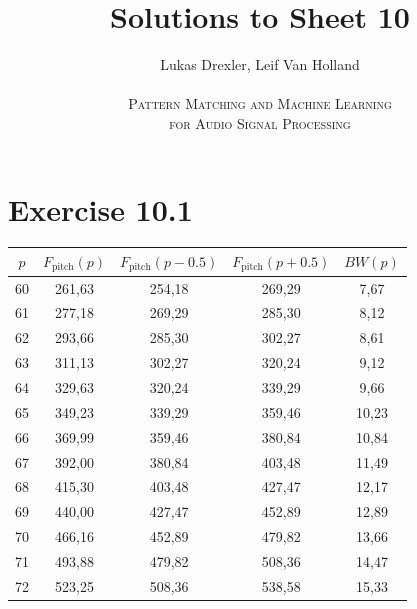\documentclass[12pt]{article}
\begin{document}
\title{Solutions to Sheet 10}
\author{Lukas Drexler, Leif Van Holland \\ \\
\textsc{Pattern Matching and Machine Learning} \\
\textsc{for Audio Signal Processing}}
\maketitle

\section*{Exercise 10.1}
\begin{center}
\begin{tabular}{c|c|c|c|c}
    $p$ & $F_{\text{pitch}}(p)$ & $F_{\text{pitch}}(p-0.5)$ & $F_{\text{pitch}}(p+0.5)$ & $BW(p)$ \\
    \hline
    60 & 261,63 & 254,18 & 269,29 & 7,67 \\
    61 & 277,18 & 269,29 & 285,30 & 8,12 \\
    62 & 293,66 & 285,30 & 302,27 & 8,61 \\
    63 & 311,13 & 302,27 & 320,24 & 9,12 \\
    64 & 329,63 & 320,24 & 339,29 & 9,66 \\
    65 & 349,23 & 339,29 & 359,46 & 10,23 \\
    66 & 369,99 & 359,46 & 380,84 & 10,84 \\
    67 & 392,00 & 380,84 & 403,48 & 11,49 \\
    68 & 415,30 & 403,48 & 427,47 & 12,17 \\
    69 & 440,00 & 427,47 & 452,89 & 12,89 \\
    70 & 466,16 & 452,89 & 479,82 & 13,66 \\
    71 & 493,88 & 479,82 & 508,36 & 14,47 \\
    72 & 523,25 & 508,36 & 538,58 & 15,33

\end{tabular}
\end{center}
\end{document}
